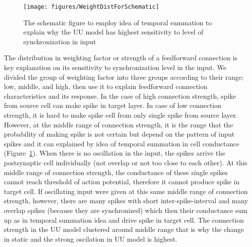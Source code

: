 \begin{figure}[!h]
	\centering
	\texttt{[image: figures/WeightDistForSchematic]}
	\caption{The schematic figure to employ idea of temporal summation \cite{magee1999dendritic}  to explain why the UU model has highest sensitivity to level of synchronization in input} 
	\label{fig:WdistSchematic}
\end{figure}



 The distribution in weighting factor or strength of a feedforward connection is key explanation on its sensitivity to synchronization level in the input.  We divided the group of weighting factor into three groups according to their range; low, middle, and high, then use it to explain feedforward connection characteristics and its response. In the case of high connection strength, spike from source cell can make spike in target layer. In case of low connection strength, it is hard to make spike cell from only single spike from source layer. However, at the middle range of connection strength, it is the range that the probability of making spike is not certain but depend on the pattern of input spikes and it can explained by idea of temporal summation in cell conductance (Figure~\ref{fig:WdistSchematic}). When there is no oscillation in the input, the spikes arrive the postsynaptic cell individually (not overlap or not too close to each other).  At this middle range of connection strength, the conductance of these single spikes cannot reach threshold of action potential, therefore it cannot produce spike in target cell.  If oscillating input were given at this same middle range of connection strength, however,  there are many spikes with short inter-spike-interval and many overlap spikes (because they are synchronized) which then their conductance sum up as in temporal summation idea and drive spike in target cell. The connection strength in the UU model clustered around middle range that is why the change in static and the strong oscilation in UU model is highest. 




